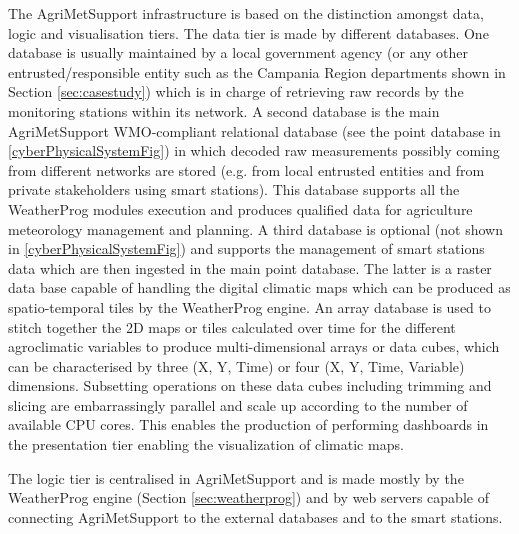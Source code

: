 \documentclass[authoryear,preprint,review,12pt]{elsarticle}
\begin{document}
The AgriMetSupport infrastructure is based on the distinction amongst data, logic and visualisation tiers.
The data tier is made by different data\-bases.
One database is usually maintained by a local government agency (or any other entrusted/responsible entity such as the Campania Region departments shown in Section \ref{sec:casestudy}) which is in charge of retrieving raw records by the monitoring stations within its network.
A second database is the main AgriMetSupport WMO-compliant relational database (see the point database in \cref{cyberPhysicalSystemFig}) in which decoded raw measurements possibly coming from different networks are stored (e.g. from local entrusted entities and from private stakeholders using smart stations).
This database supports all the WeatherProg modules execution and produces qualified data for agriculture meteorology management and planning.
A third database is optional (not shown in \cref{cyberPhysicalSystemFig}) and supports the management of smart stations data which are then ingested in the main point database.
The latter is a raster data base capable of handling the digital climatic maps which can be produced as spatio-temporal tiles by the WeatherProg engine.
An array database is used to stitch together the 2D maps or tiles calculated over time for the different agroclimatic variables to produce multi-dimensional arrays or data cubes, which can be  characterised by three (X, Y, Time) or four (X, Y, Time, Variable) dimensions.
Subsetting operations on these data cubes including trimming and slicing are embarrassingly parallel and scale up according to the number of available CPU cores.
This enables the production of performing dashboards in the presentation tier enabling the visualization of climatic maps.

The logic tier is centralised in AgriMetSupport and is made mostly by the WeatherProg engine (Section \ref{sec:weatherprog}) and by web servers capable of connecting AgriMetSupport to the external databases and to the smart stations.
\end{document}
